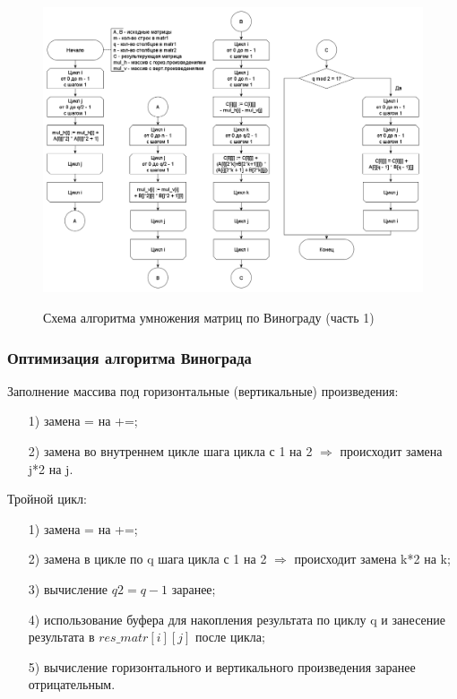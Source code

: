\documentclass[a4paper,14pt]{article}
\begin{document}
        \begin{figure}[h!]
        	\begin{center}
        		{\includegraphics[scale = 0.35]{winograd.png}}
        		\caption{Схема алгоритма умножения матриц по Винограду (часть 1)}
        		\label{fig:schema_mult_v_1}
        	\end{center}
        \end{figure}
        
        \subsubsection{Оптимизация алгоритма Винограда}
        		Заполнение массива под горизонтальные (вертикальные) произведения:
	\begin{enumerate} 
	\item[1)] замена = на +=;
	\item[2)] замена во внутреннем цикле шага цикла с 1 на 2 $\Rightarrow$ происходит замена j*2 на j.
	\end{enumerate}
	
	Тройной цикл:
	\begin{enumerate} 
	\item[1)] замена = на +=;
	\item[2)] замена в цикле по q шага цикла с 1 на 2 $\Rightarrow$ происходит замена k*2 на k;
	\item[3)] вычисление $q2 = q - 1$ заранее;
	\item[4)] использование буфера для накопления результата по циклу q и занесение результата в $res\_matr[i][j]$ после цикла;
	\item[5)] вычисление горизонтального и вертикального произведения заранее отрицательным.

	\end{enumerate}
	
\end{document}
